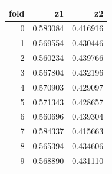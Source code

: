 \begin{tabular}{rrr}
\toprule
fold & z1 & z2 \\
\midrule
0 & 0.583084 & 0.416916 \\
1 & 0.569554 & 0.430446 \\
2 & 0.560234 & 0.439766 \\
3 & 0.567804 & 0.432196 \\
4 & 0.570903 & 0.429097 \\
5 & 0.571343 & 0.428657 \\
6 & 0.560696 & 0.439304 \\
7 & 0.584337 & 0.415663 \\
8 & 0.565394 & 0.434606 \\
9 & 0.568890 & 0.431110 \\
\bottomrule
\end{tabular}
